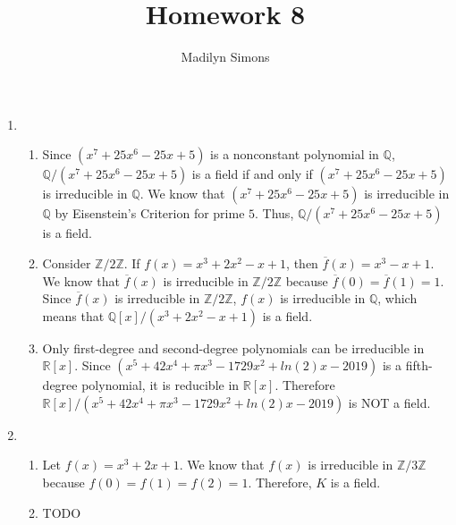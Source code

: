 \documentclass{article}
\title{Homework 8}
\author{Madilyn Simons}
\date{}
\begin{document}
\maketitle

\begin{enumerate}

\item
\begin{enumerate}

\item Since $(x^7 + 25x^6 - 25x + 5)$ is a nonconstant polynomial in
$\mathbb{Q}$, $\mathbb{Q}/(x^7 + 25x^6 - 25x + 5)$ is a field if and only if
$(x^7 + 25x^6 - 25x + 5)$ is irreducible in $\mathbb{Q}$.  We know that
$(x^7 + 25x^6 - 25x + 5)$ is irreducible in $\mathbb{Q}$ by Eisenstein's
Criterion for prime $5$.  Thus, $\mathbb{Q}/(x^7 + 25x^6 - 25x + 5)$ is a field.

\item Consider $\mathbb{Z}/2\mathbb{Z}$.  If $f(x) = x^3 + 2x^2 - x + 1$, then
$\overline{f}(x) = x^3 - x + 1$.  We know that $\overline{f}(x)$ is
irreducible in $\mathbb{Z}/2\mathbb{Z}$ because
$\overline{f}(0) = \overline{f}(1) = 1$.  Since $\overline{f}(x)$ is
irreducible in $\mathbb{Z}/2\mathbb{Z}$, $f(x)$ is irreducible in $\mathbb{Q}$,
which means that $\mathbb{Q}[x]/(x^3 + 2x^2 - x + 1)$ is a field.

\item Only first-degree and second-degree polynomials can be irreducible in
$\mathbb{R}[x]$.  Since $(x^5 + 42x^4 + \pi x^3 -1729x^2 + ln(2)x - 2019)$
is a fifth-degree polynomial, it is reducible in $\mathbb{R}[x]$.  Therefore
$\mathbb{R}[x]/(x^5 + 42x^4 + \pi x^3 -1729x^2 + ln(2)x - 2019)$ is NOT
a field.

\end{enumerate}

\item
\begin{enumerate}
\item
Let $f(x) = x^3 + 2x + 1$.  We know that $f(x)$ is irreducible in
$\mathbb{Z}/3\mathbb{Z}$ because $f(0) = f(1) = f(2) = 1$.  Therefore,
$K$ is a field.

\item TODO

\end{enumerate}

\end{enumerate}
\end{document}
